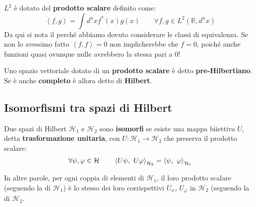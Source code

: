 \documentclass[FisicaTeorica.tex]{subfiles}
\begin{document}
$L^2$ è dotato del \textbf{prodotto scalare} definito come:
\[
	\left\langle f,g\right\rangle=\int d^n x f^*\left(x\right)g\left(x\right) \qquad \forall f,g \in L^2\left(\mathbb{R},d^n x\right)
\]
Da qui si nota il perché abbiamo dovuto considerare le classi di equivalenza. Se non lo avessimo fatto $\left\langle f,f\right\rangle=0$ non implicherebbe che $f=0$, poiché anche funzioni quasi ovunque nulle avrebbero la stessa  pari a $0$!
\begin{dfn}
Uno spazio vettoriale dotato di un \textbf{prodotto scalare} è detto \textbf{pre-Hilbertiano}. Se è anche \textbf{completo} è allora detto di \textbf{Hilbert}.
\end{dfn}

\subsection{Isomorfismi tra spazi di Hilbert}
\begin{dfn}
Due spazi di Hilbert $\mathcal{H}_1$ e $\mathcal{H}_2$ sono \textbf{isomorfi} se esiste una mappa biiettiva $U$, detta \textbf{trasformazione unitaria}, con $U:\mathcal{H}_1\rightarrow\mathcal{H}_2$ che preserva il prodotto scalare:
\[
	\forall \psi, \varphi \in \hs \qquad \left\langle U\psi,\ U\varphi\right\rangle_{\mathcal{H}_2}=\left\langle\psi,\ \varphi\right\rangle_{\mathcal{H}_1}
\]
\end{dfn}
In altre parole, per ogni coppia di elementi di $\mathcal{H}_1$, il loro prodotto scalare (seguendo la  di $\mathcal{H}_1$) è lo stesso dei loro corrispettivi $U_\psi$, $U_\varphi$ in $\mathcal{H}_2$ (seguendo la  di $\mathcal{H}_2$.
\end{document}
